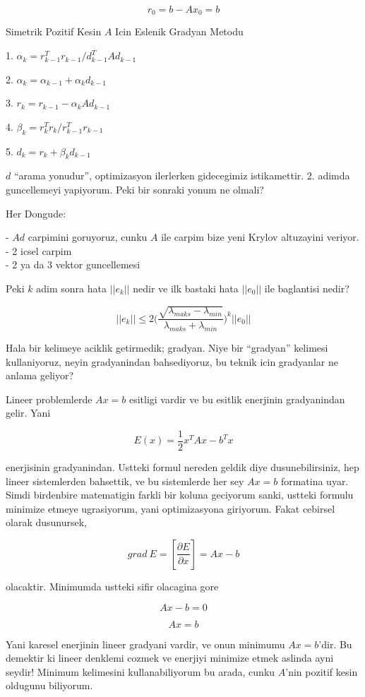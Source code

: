 \documentclass[12pt,fleqn]{article}\usepackage{../common}
\begin{document}
\[ r_0 = b - Ax_0  = b\]

Simetrik Pozitif Kesin $A$ Icin Eslenik Gradyan Metodu

1. $\alpha_k = r_{k-1}^T r_{k-1} / d_{k-1}^T A d_{k-1}$

2. $\alpha_k = \alpha_{k-1} + \alpha_k d_{k-1}$

3. $r_k = r_{k-1} - \alpha_k Ad_{k-1}$

4. $\beta_k = r_k^Tr_k / r_{k-1}^Tr_{k-1}$

5. $d_k = r_k + \beta_k d_{k-1}$

$d$ ``arama yonudur'', optimizasyon ilerlerken gidecegimiz
istikamettir. 2. adimda guncellemeyi yapiyorum. Peki bir sonraki yonum ne
olmali? 

Her Dongude:

- $Ad$ carpimini goruyoruz, cunku $A$ ile carpim bize yeni Krylov altuzayini
veriyor.\\
- 2 icsel carpim \\
- 2 ya da 3 vektor guncellemesi

Peki $k$ adim sonra hata $||e_k||$ nedir ve ilk bastaki hata $||e_0||$ ile
baglantisi nedir? 

\[ ||e_k|| \le 2  \bigg(
\frac{ \sqrt{ \lambda_{maks} - \lambda_{min}}}
{\lambda_{maks} + \lambda_{min}}
\bigg)^k||e_0||
\]

Hala bir kelimeye aciklik getirmedik; gradyan. Niye bir ``gradyan''
kelimesi kullaniyoruz, neyin gradyanindan bahsediyoruz, bu teknik icin
gradyanlar ne anlama geliyor?

Lineer problemlerde $Ax = b$ esitligi vardir ve bu esitlik enerjinin
gradyanindan gelir. Yani 

\[ E(x) = \frac{ 1}{2}x^TAx - b^Tx \]

enerjisinin gradyanindan. Ustteki formul nereden geldik diye
dusunebilirsiniz, hep lineer sistemlerden bahsettik, ve bu sistemlerde her
sey $Ax = b$ formatina uyar. Simdi birdenbire matematigin farkli bir koluna
geciyorum sanki, ustteki formulu minimize etmeye ugrasiyorum, yani
optimizasyona giriyorum. Fakat cebirsel olarak dusunursek, 

\[ grad \ E = [\frac{\partial E}{\partial x} ]  = Ax - b \]

olacaktir. Minimumda ustteki sifir olacagina gore 

\[ Ax - b = 0 \]

\[ Ax = b \]

Yani karesel enerjinin lineer gradyani vardir, ve onun minimumu $Ax =
b$'dir. 
Bu demektir ki lineer denklemi cozmek ve enerjiyi minimize etmek
aslinda ayni seydir! Minimum kelimesini kullanabiliyorum bu arada, cunku
$A$'nin pozitif kesin oldugunu biliyorum. 
\end{document}
